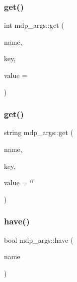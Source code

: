 \mbox{\label{classmdp__args_a7735776e058d61a0be54a13cdb87a014}} 
\subsubsection{\texorpdfstring{get()}{get()}\hspace{0.1cm}{\footnotesize\ttfamily [3/4]}}
{\footnotesize\ttfamily int mdp\+\_\+args\+::get (\begin{DoxyParamCaption}\item[{string}]{name,  }\item[{string}]{key,  }\item[{int}]{value = {} }\end{DoxyParamCaption})\hspace{0.3cm}{\ttfamily [inline]}}

\mbox{\label{classmdp__args_ac84bef25184f9d153f1a7c4f45491bc8}} 
\subsubsection{\texorpdfstring{get()}{get()}\hspace{0.1cm}{\footnotesize\ttfamily [4/4]}}
{\footnotesize\ttfamily string mdp\+\_\+args\+::get (\begin{DoxyParamCaption}\item[{string}]{name,  }\item[{string}]{key,  }\item[{string}]{value = {\ttfamily \char`\"{}\char`\"{}} }\end{DoxyParamCaption})\hspace{0.3cm}{\ttfamily [inline]}}

\mbox{\label{classmdp__args_a160fdc0fcf2612788d86edc4431110de}} 
\subsubsection{\texorpdfstring{have()}{have()}}
{\footnotesize\ttfamily bool mdp\+\_\+args\+::have (\begin{DoxyParamCaption}\item[{string}]{name }\end{DoxyParamCaption})\hspace{0.3cm}{\ttfamily [inline]}}

